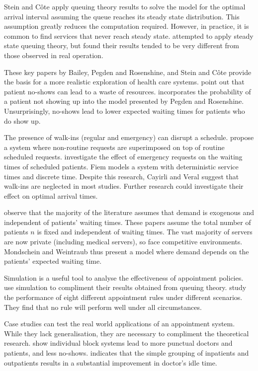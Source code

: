 Stein and C\^{o}te apply queuing theory results to solve the model for the optimal arrival interval assuming the queue reaches its steady state distribution. This assumption greatly reduces the computation required. However, in practice, it is common to find services that never reach steady state. \citet{Babes} attempted to apply steady state queuing theory, but found their results tended to be very different from those observed in real operation.

These key papers by Bailey, Pegden and Rosenshine, and Stein and C\^{o}te provide the basis for a more realistic exploration of health care systems. \citet{Delaurentis} point out that patient no-shows can lead to a waste of resources. \citet{Mendel} incorporates the probability of a patient not showing up into the model presented by Pegden and Rosenshine. Unsurprisingly, no-shows lead to lower expected waiting times for patients who do show up.

The presence of walk-ins (regular and emergency) can disrupt a schedule. \citet{Gupta} propose a system where non-routine requests are superimposed on top of routine scheduled requests. \citet{Fiems} investigate the effect of emergency requests on the waiting times of scheduled patients. Fiem models a system with deterministic service times and discrete time. Despite this research, Cayirli and Veral suggest that walk-ins are neglected in most studies. Further research could investigate their effect on optimal arrival times.

\citet{Mondschein} observe that the majority of the literature assumes that demand is exogenous and independent of patients' waiting times. These papers assume the total number of patients $n$ is fixed and independent of waiting times. The vast majority of servers are now private (including medical servers), so face competitive environments. Mondschein and Weintraub thus present a model where demand depends on the patients' expected waiting time.

Simulation is a useful tool to analyse the effectiveness of appointment policies. \citet{Kao} use simulation to compliment their results obtained from queuing theory. \citet{Ho} study the performance of eight different appointment rules under different scenarios. They find that no rule will perform well under all circumstances.

Case studies can test the real world applications of an appointment system. While they lack generalisation, they are necessary to compliment the theoretical research. \citet{Rockart} show individual block systems lead to more punctual doctors and patients, and less no-shows. \citet{Walter} indicates that the simple grouping of inpatients and outpatients results in a substantial improvement in doctor's idle time.

